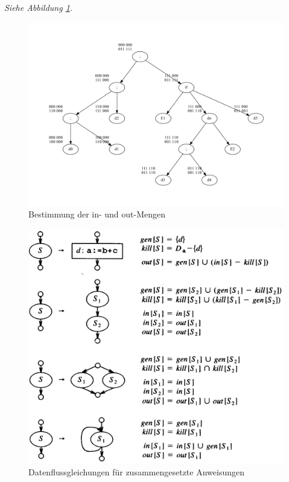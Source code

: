 \textit{Siehe Abbildung \ref{convent:inout}.}
\begin{figure}
    \centering
    \includegraphics[scale=0.45]{images/convent-inout.pdf}
    \caption{Bestimmung der in- und out-Mengen}
    \label{convent:inout}
\end{figure}

\begin{figure}[p]
  \centering
  \includegraphics[scale=0.2]{images/bild1-3.png}
  \caption{Datenflussgleichungen für zusammengesetzte Anweisungen}
  \label{fig:datenflussgleichungen}
\end{figure}


